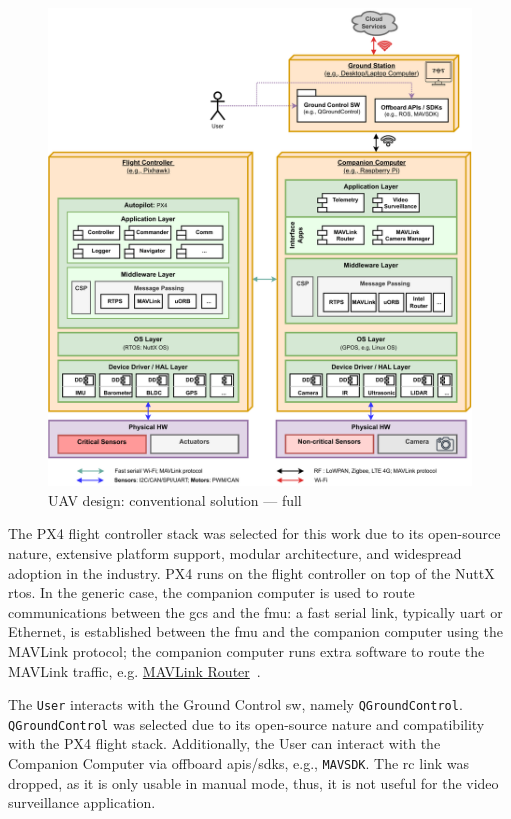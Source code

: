 \begin{figure}[!hbt]
  \centering
  \includegraphics[width=1.0\textwidth]{./img/pdf/uav-main-design-conv-sol-1.pdf} 
%   
  \caption{UAV design: conventional solution --- full}%
  \label{fig:uav-design-conv-sol-1}
\end{figure}

The PX4 flight controller stack was selected for this work due to its
open-source nature, extensive platform support, modular architecture, and
widespread adoption in the industry. PX4 runs on the flight controller on top of
the NuttX \gls{rtos}. In the generic case, the companion computer is used to
route communications between the \gls{gcs} and the \gls{fmu}: a fast serial
link, typically \gls{uart} or Ethernet, is established between the \gls{fmu} and
the companion computer using the MAVLink protocol; the companion computer
runs extra software to route the MAVLink traffic,
e.g. \href{https://github.com/mavlink-router/mavlink-router}{MAVLink
  Router}~\cite{px4-routers}.

The \lstinline{User} interacts with the Ground Control \gls{sw}, namely
\lstinline{QGroundControl}. \lstinline{QGroundControl} was selected due to its
open-source nature and compatibility with the PX4 flight stack. Additionally,
the User can interact with the Companion Computer via offboard
\glspl{api}/\glspl{sdk}, e.g., \lstinline{MAVSDK}. The \gls{rc} link was dropped,
as it is only usable in manual mode, thus, it is not useful for the video
surveillance application.

